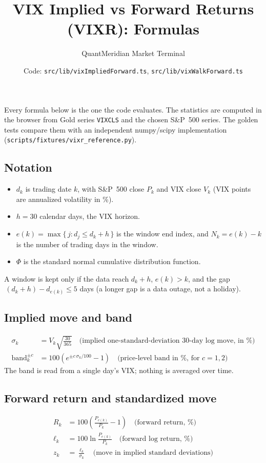 \documentclass[11pt]{article}
\title{VIX Implied vs Forward Returns (VIXR): Formulas}
\author{QuantMeridian Market Terminal}
\date{Code: \texttt{src/lib/vixImpliedForward.ts}, \texttt{src/lib/vixWalkForward.ts}}
\begin{document}
\maketitle

\noindent Every formula below is the one the code evaluates. The statistics are computed in the browser from Gold
series \texttt{VIXCLS} and the chosen S\&P~500 series. The golden tests compare them with an independent
numpy/scipy implementation (\texttt{scripts/fixtures/vixr\_reference.py}).

\subsection*{Notation}
\begin{itemize}
\item $d_k$ is trading date $k$, with S\&P~500 close $P_k$ and VIX close $V_k$ (VIX points are annualized volatility in \%).
\item $h = 30$ calendar days, the VIX horizon.
\item $e(k) = \max\{\, j : d_j \le d_k + h \,\}$ is the window end index, and $N_k = e(k) - k$ is the number of trading days in the window.
\item $\Phi$ is the standard normal cumulative distribution function.
\end{itemize}
A window is kept only if the data reach $d_k + h$, $e(k) > k$, and the gap $\,(d_k + h) - d_{e(k)} \le 5$ days (a longer gap is a data outage, not a holiday).

\subsection*{Implied move and band}
\begin{align*}
\sigma_k &= V_k \sqrt{\tfrac{30}{365}} \quad \text{(implied one-standard-deviation 30-day log move, in \%)}\\
\text{band}_k^{\pm c} &= 100\left(e^{\pm c\,\sigma_k/100} - 1\right) \quad \text{(price-level band in \%, for } c = 1, 2\text{)}
\end{align*}
The band is read from a single day's VIX; nothing is averaged over time.

\subsection*{Forward return and standardized move}
\begin{align*}
R_k &= 100\left(\frac{P_{e(k)}}{P_k} - 1\right) \quad \text{(forward return, \%)}\\
\ell_k &= 100 \ln\frac{P_{e(k)}}{P_k} \quad \text{(forward log return, \%)}\\
z_k &= \frac{\ell_k}{\sigma_k} \quad \text{(move in implied standard deviations)}
\end{align*}
\end{document}
